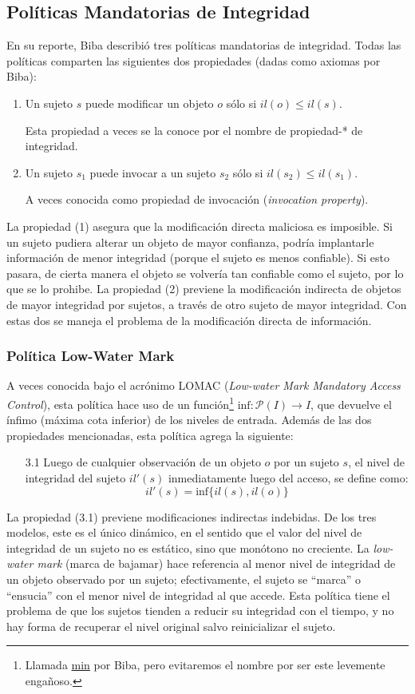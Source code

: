 \documentclass[spanish]{article}
\theoremstyle{definition}
\begin{document}
\subsection{Políticas Mandatorias de Integridad}

En su reporte, Biba describió tres políticas mandatorias de integridad. Todas
las políticas comparten las siguientes dos propiedades (dadas como axiomas
por Biba):
\begin{enumerate}
  \item Un sujeto $s$ puede modificar un objeto $o$ sólo si $il(o) \leq il(s)$.

    Esta propiedad a veces se la conoce por el nombre de propiedad-* de
    integridad.

  \item Un sujeto $s_1$ puede invocar a un sujeto $s_2$ sólo si $il(s_2) \leq il(s_1)$.

    A veces conocida como propiedad de invocación (\textit{invocation property}).
\end{enumerate}
La propiedad (1) asegura que la modificación directa maliciosa es imposible. Si
un sujeto pudiera alterar un objeto de mayor confianza, podría implantarle
información de menor integridad (porque el sujeto es menos confiable). Si esto
pasara, de cierta manera el objeto se volvería tan confiable como el sujeto, por
lo que se lo prohibe.
La propiedad (2) previene la modificación indirecta de objetos de mayor integridad por
sujetos, a través de otro sujeto de mayor integridad. Con estas dos se maneja el
problema de la modificación directa de información.

\subsubsection{Política Low-Water Mark}
A veces conocida bajo el acrónimo LOMAC (\textit{Low-water Mark Mandatory Access
Control}), esta política hace uso de un función\footnote{Llamada \underline{min}
por Biba, pero evitaremos el nombre por ser este levemente engañoso.}
$\text{inf}\colon \mathcal{P}(I) \to I$, que devuelve el ínfimo (máxima cota
inferior) de los niveles de entrada. Además de las dos propiedades mencionadas,
esta política agrega la siguiente:
\begin{itemize}
  \item[3.1] Luego de cualquier observación de un objeto $o$ por un sujeto $s$, el
    nivel de integridad del sujeto $il'(s)$ inmediatamente luego del acceso,
    se define como:
    \[ il'(s) = \text{inf}\{il(s), il(o)\} \]
  \end{itemize}
La propiedad (3.1) previene modificaciones indirectas indebidas.
De los tres modelos, este es el único dinámico, en el sentido que el valor del
nivel de integridad de un sujeto no es estático, sino que monótono no
creciente. La \textit{low-water mark} (marca de bajamar) hace referencia al
menor nivel de integridad de un objeto observado por un sujeto; efectivamente,
el sujeto se ``marca'' o ``ensucia'' con el menor nivel de integridad al que
accede. Esta política tiene el problema de que los sujetos tienden a reducir su
integridad con el tiempo, y no hay forma de recuperar el nivel original salvo
reinicializar el sujeto.
\end{document}
